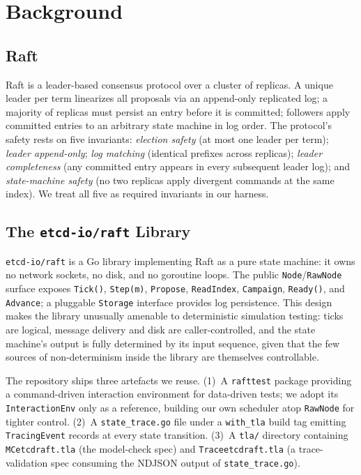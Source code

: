 \documentclass{article}
\begin{document}
\section{Background}
\label{sec:background}

\subsection{Raft}
Raft \cite{ongaro2014search} is a leader-based consensus protocol over
a cluster of replicas. A unique leader per term linearizes all
proposals via an append-only replicated log; a majority of replicas
must persist an entry before it is committed; followers apply
committed entries to an arbitrary state machine in log order. The
protocol's safety rests on five invariants: \emph{election safety}
(at most one leader per term); \emph{leader append-only}; \emph{log
matching} (identical prefixes across replicas); \emph{leader
completeness} (any committed entry appears in every subsequent leader
log); and \emph{state-machine safety} (no two replicas apply
divergent commands at the same index). We treat all five as required
invariants in our harness.

\subsection{The \texttt{etcd-io/raft} Library}
\label{sec:bg-etcd}
\texttt{etcd-io/raft} is a Go library implementing Raft as a pure
state machine: it owns no network sockets, no disk, and no goroutine
loops. The public \texttt{Node}/\texttt{RawNode} surface exposes
\texttt{Tick()}, \texttt{Step(m)}, \texttt{Propose}, \texttt{ReadIndex},
\texttt{Campaign}, \texttt{Ready()}, and \texttt{Advance}; a pluggable
\texttt{Storage} interface provides log persistence. This design makes
the library unusually amenable to deterministic simulation testing:
ticks are logical, message delivery and disk are caller-controlled,
and the state machine's output is fully determined by its input
sequence, given that the few sources of non-determinism inside the
library are themselves controllable.

The repository ships three artefacts we reuse. (1)~A \texttt{rafttest}
package providing a command-driven interaction environment for
data-driven tests; we adopt its \texttt{InteractionEnv} only as a
reference, building our own scheduler atop \texttt{RawNode} for tighter
control. (2)~A \texttt{state\_trace.go} file under a
\texttt{with\_tla} build tag emitting \texttt{TracingEvent} records at
every state transition. (3)~A \texttt{tla/} directory containing
\texttt{MCetcdraft.tla} (the model-check spec) and
\texttt{Traceetcdraft.tla} (a trace-validation spec consuming the
NDJSON output of \texttt{state\_trace.go}).
\end{document}
